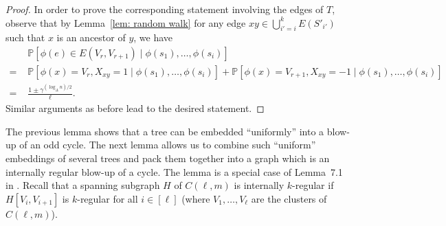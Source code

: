 \documentclass[a4paper, 11pt, reqno]{amsart}
\numberwithin{equation}{section}
\newcommand{\1}{{\rm 1\hspace*{-0.4ex}%
\rule{0.1ex}{1.52ex}\hspace*{0.2ex}}}
\newcommand{\COMMENT}[1]{}
\begin{document}
\begin{proof}
In order to prove the corresponding statement involving the edges of $T$, 
observe that by Lemma~\ref{lem: random walk} for any edge $xy\in \bigcup_{i'=i}^k E(S'_{i'})$ such that $x$ is an ancestor of $y$, we have 
\begin{align*}
&\mathbb{P}[\phi(e) \in E(V_r,V_{r+1}) \mid \phi(s_1),\ldots,\phi(s_i) ] \\
=\,\, & \mathbb{P}[\phi(x) =V_r, X_{xy}=1 \mid \phi(s_1),\ldots,\phi(s_i) ] + \mathbb{P}[\phi(x) =V_{r+1}, X_{xy}=-1 \mid\phi(s_1),\ldots,\phi(s_i) ] \\ 
=\,\, & \frac{1 \pm \gamma^{(\log_{\Delta}n)/2}}{\ell}.
\end{align*}
Similar arguments as before lead to the desired statement.\COMMENT{The edges between different $S_i$ don't matter as there at at most $k\leq n^\delta$ of them.}
\end{proof}

The previous lemma shows that a tree can be embedded ``uniformly'' into a blow-up of an odd cycle. The next lemma allows us to combine such ``uniform'' embeddings of several trees and pack them together into a graph which is an internally regular blow-up of a cycle. 
The lemma is a special case of Lemma~7.1 in \cite{KKOT16}. 
Recall that a spanning subgraph $H$ of $C(\ell,m)$ is internally $k$-regular if $H[V_i,V_{i+1}]$ is $k$-regular for all $i\in [\ell]$ (where $V_1,\dots, V_\ell$ are the clusters of $C(\ell,m)$).
\end{document}
